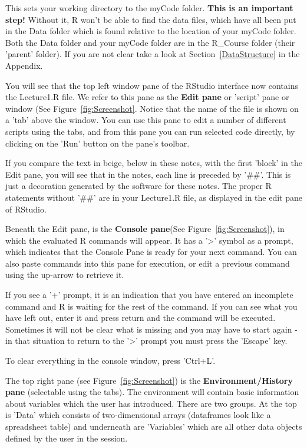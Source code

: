 \documentclass[titlepage]{book}\usepackage{knitr}
\begin{document}
This sets your working directory to the myCode folder. \textbf{This is an important step!}  Without it, R won't be able to find the data files, which have all been put in the Data folder which is found relative to the location of your myCode folder. Both the Data folder and your myCode folder are in the R\_Course folder (their 'parent' folder). If you are not clear take a look at Section~\ref{DataStructure} in the Appendix.

You will see that the top left window pane of the RStudio interface now contains the Lecture1.R file.   We refer  to this pane as the \textbf{Edit pane} or 'script' pane or window (See Figure~\ref{fig:Screenshot}.  Notice that the name of the file is shown on a 'tab' above the window. You can use this pane to edit a number of different scripts using the tabs, and from this pane you can run selected code directly, by clicking on the 'Run' button on the pane's toolbar.

If you compare the text in beige, below in these notes, with the first 'block' in the Edit pane, you will see that in the notes, each line is preceded by '\#\#'. This is just a decoration generated by the software for these notes. The proper R statements without '\#\#' are in your Lecture1.R file, as displayed in the edit pane of RStudio.

Beneath the Edit pane, is the \textbf{Console pane}(See Figure~\ref{fig:Screenshot}), in which the evaluated R commands will appear. It has a '>' symbol as a prompt, which indicates that the Console Pane is ready for your next command.  You can also paste commands into this pane for execution, or edit a previous command using the up-arrow to retrieve it. 

If you see a '+' prompt, it is an indication that you have entered an incomplete command and R is waiting for the rest of the command. If you can see what you have left out, enter it and press return and the command will be executed.  Sometimes it will not be clear what is missing and you may have to start again -  in that situation to return to the '>' prompt you must press the 'Escape' key.  

To clear everything in the console window, press 'Ctrl+L'.

The top right pane (see Figure~\ref{fig:Screenshot}) is the \textbf{Environment/History pane} (selectable using the tabs). The environment will contain basic information about variables which the user has introduced. There are two groups. At the top is 'Data' which consists of two-dimensional arrays (dataframes look like a spreadsheet table) and underneath are 'Variables' which are all other data objects defined by the user in the session.
\end{document}

